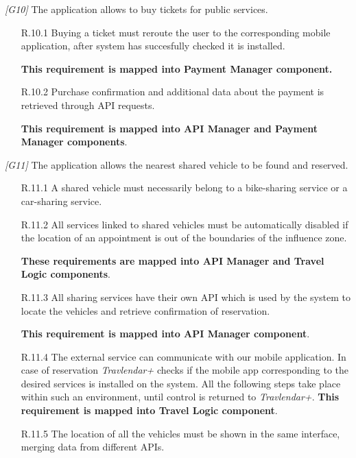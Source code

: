 \begin{description}
	\vskip0.75cm
	\item \textit{[G10]} The application allows to buy tickets for public services.
		\begin{itemize}
			\item[R.10.1] Buying a ticket must reroute the user to the corresponding mobile application, after system has succesfully checked it is installed.

			\textbf{This requirement is mapped into Payment Manager component.}
			
			\item[R.10.2] Purchase confirmation and additional data about the payment is retrieved through API requests.
			
			\textbf{This requirement is mapped into API Manager and Payment Manager components}.
		\end{itemize}


	\vskip0.75cm
	\item \textit{[G11]} The application allows the nearest shared vehicle to be found and reserved.
		\begin{itemize}
			\item [R.11.1] A shared vehicle must necessarily belong to a bike-sharing service or a car-sharing service.

			\item [R.11.2] All services linked to shared vehicles must be automatically disabled if the location of an appointment is out of the boundaries of the influence zone.

			\textbf{These requirements are mapped into API Manager and Travel Logic components}.


			\item [R.11.3] All sharing services have their own API which is used by the system to locate the vehicles and retrieve confirmation of reservation.

			\textbf{This requirement is mapped into API Manager component}.

			\item [R.11.4] The external service can communicate with our mobile application. In case of reservation \textit{Travlendar+} checks if the mobile app corresponding to the desired services is installed on the system. All the following steps take place within such an environment, until control is returned to \textit{Travlendar+}.			
			\textbf{This requirement is mapped into Travel Logic component}.

			\item [R.11.5] The location of all the vehicles must be shown in the same interface, merging data from different APIs.


\end{itemize}
\end{description}
